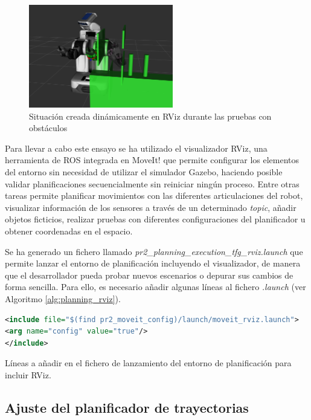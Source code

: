 \documentclass[12pt,spanish,chapterprefix, numbers=noenddot]{book}
\numberwithin{equation}{section}
\numberwithin{figure}{section}
\begin{document}
\begin{figure}[hbt!]
\centering
\includegraphics[height=4.5cm]{Figs/RVIZ.png}
\par
\caption{\label{fig:rviz}Situación creada dinámicamente en RViz durante las pruebas con obstáculos}
\end{figure}

Para llevar a cabo este ensayo se ha utilizado el visualizador RViz, una herramienta de ROS integrada en MoveIt! que permite configurar los elementos del entorno sin necesidad de utilizar el simulador Gazebo, haciendo posible validar planificaciones secuencialmente sin reiniciar ningún proceso. Entre otras tareas permite planificar movimientos con las diferentes articulaciones del robot, visualizar información de los sensores a través de un determinado \textit{topic}, añadir objetos ficticios, realizar pruebas con diferentes configuraciones del planificador u obtener coordenadas en el espacio. 

Se ha generado un fichero llamado \textit{pr2\_planning\_execution\_tfg\_rviz.launch} que permite lanzar el entorno de planificación incluyendo el visualizador, de manera que el desarrollador pueda probar nuevos escenarios o depurar sus cambios de forma sencilla. Para ello, es necesario añadir algunas líneas al fichero \textit{.launch} (ver Algoritmo \ref{alg:planning_rviz}).  %

\begin{algorithm}[htb!]
	\begin{lstlisting}[breaklines=true,language=xml] 
<include file="$(find pr2_moveit_config)/launch/moveit_rviz.launch">
<arg name="config" value="true"/>
</include>
	\end{lstlisting}
\caption{\label{alg:planning_rviz}Líneas a añadir en el fichero de lanzamiento del entorno de planificación para incluir RViz.}
\end{algorithm}
\newpage
\subsection{Ajuste del planificador de trayectorias}
\end{document}
